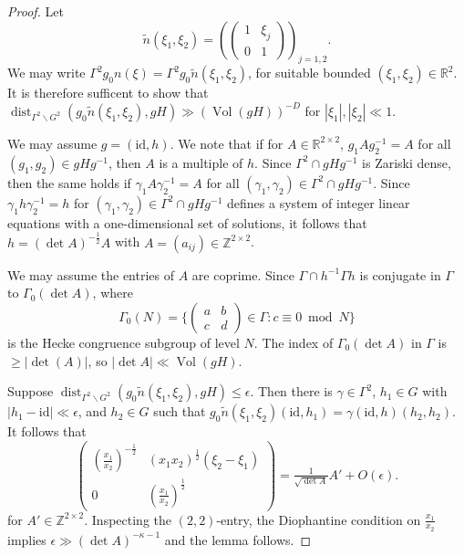 \documentclass[12pt]{amsart}
\theoremstyle{definition}
\theoremstyle{remark}
\numberwithin{equation}{section}
\newcommand{\R}{\mathbb{R}}
\newcommand{\Z}{\mathbb{Z}}
\begin{document}
\begin{proof}
  Let $$\tilde n(\xi_1, \xi_2) =
  \left(
  \begin{pmatrix}
    1 & \xi_j \\
    0 & 1
  \end{pmatrix}
\right)_{\!\! j=1,2} . $$
 We may write $\Gamma^2 g_0 n(\xi) = \Gamma^2 g_0 \tilde n(\xi_1, \xi_2)$, for suitable bounded $(\xi_1, \xi_2)\in\R^2$.
  It is therefore sufficent to show that $\operatorname{dist}_{\Gamma^2 \backslash G^2} (g_0 \tilde n(\xi_1, \xi_2), g H) \gg (\operatorname{Vol}(g H))^{-D}$
  for $|\xi_1|, |\xi_2| \ll 1$. 
  
  We may assume $g = (\mathrm{id}, h)$.
  We note that if for $A \in \R^{2 \times 2}$, $g_1 A g_2^{-1} =A$ for all $(g_1,g_2) \in g H g^{-1}$, then $A$ is a multiple of $h$.
  Since $\Gamma^2 \cap g H g^{-1}$ is Zariski dense, then the same holds if $\gamma_1 A \gamma_2^{-1} = A$ for all $(\gamma_1, \gamma_2) \in \Gamma^2 \cap g H g^{-1}$.
  Since $\gamma_1 h \gamma_2^{-1} = h$ for $(\gamma_1, \gamma_2) \in \Gamma^2 \cap g H g^{-1}$ defines a system of integer linear equations with a one-dimensional set of solutions, it follows that $h = (\det A)^{-\frac{1}{2}} A$ with $A = (a_{ij})\in \Z^{2\times 2}$.

  We may assume the entries of $A$ are coprime.  
  Since $\Gamma \cap h^{-1} \Gamma h$ is conjugate in $\Gamma$ to $\Gamma_0(\det A)$, where
  $$\Gamma_0(N) = \{
  \begin{pmatrix}
    a & b \\
    c & d
  \end{pmatrix}
  \in \Gamma : c \equiv 0 \bmod N\}
  $$ is the Hecke congruence subgroup of level $N$.
  The index of $\Gamma_0(\det A)$ in $\Gamma$ is $\geq |\det(A)|$, so $|\det A| \ll \operatorname{Vol}(gH)$.

  Suppose $\operatorname{dist}_{\Gamma^2 \backslash G^2} (g_0 \tilde n(\xi_1, \xi_2), g H)  \leq \epsilon$.
  Then there is $\gamma \in \Gamma^2$, $h_1 \in G$ with $|h_1 - \mathrm{id}| \ll \epsilon$, and $h_2 \in G$ such that $g_0 \tilde n(\xi_1, \xi_2) (\mathrm{id}, h_1)= \gamma (\mathrm{id}, h) (h_2, h_2)$.
  It follows that
  \begin{equation}
    \label{eq:x1x2diophantineapprox}
    \begin{pmatrix}
      (\tfrac{x_1}{x_2})^{-\frac{1}{2}} & (x_1 x_2)^{\frac{1}{2}} (\xi_2 - \xi_1) \\
      0 & ( \tfrac{x_1}{x_2})^{\frac{1}{2}}
    \end{pmatrix}
    = \tfrac{1}{\sqrt{\det A}} A' + O(\epsilon).
  \end{equation}
  for $A' \in \Z^{2\times 2}$.
  Inspecting the $(2,2)$-entry, the Diophantine condition on $\tfrac{x_1}{x_2}$ implies $\epsilon \gg (\det A)^{-\kappa -1}$ and the lemma follows. 
\end{proof}
\end{document}
